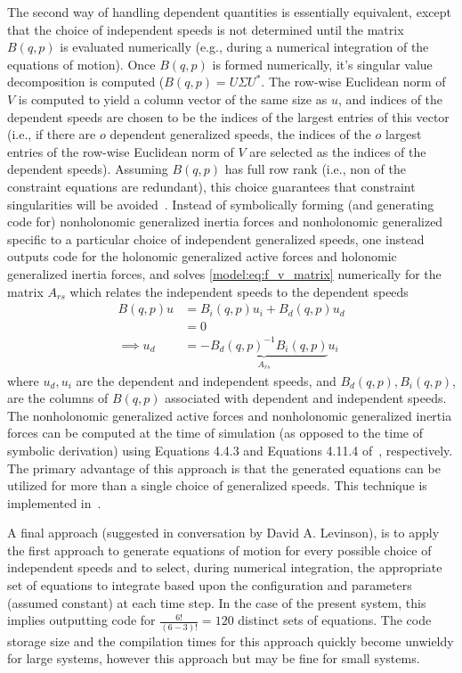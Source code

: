 The second way of handling dependent quantities is essentially equivalent,
except that the choice of independent speeds is not determined until the matrix
$B(q,p)$ is evaluated numerically (e.g., during a numerical integration of the
equations of motion). Once $B(q, p)$ is formed numerically, it's singular value
decomposition is computed ($B(q, p) = U\Sigma U^*$. The row-wise Euclidean norm
of $V$ is computed to yield a column vector of the same size as $u$, and
indices of the dependent speeds are chosen to be the indices of the largest
entries of this vector (i.e., if there are $o$ dependent generalized speeds,
the indices of the $o$ largest entries of the row-wise Euclidean norm of $V$
are selected as the indices of the dependent speeds). Assuming $B(q, p)$ has
full row rank (i.e., non of the constraint equations are redundant), this
choice guarantees that constraint singularities will be
avoided~\cite{Reckdahl1996}. Instead of symbolically forming (and generating
code for) nonholonomic generalized inertia forces and nonholonomic generalized
specific to a particular choice of independent generalized speeds, one instead
outputs code for the holonomic generalized active forces and holonomic
generalized inertia forces, and solves \autoref{model:eq:f_v_matrix}
numerically for the matrix $A_{rs}$ which relates the independent speeds to the
dependent speeds
\begin{align}
  B(q, p) u &= B_i(q, p) u_i + B_d(q, p) u_d \\
            &= 0 \\
\implies u_d &= \underbrace{-B_d(q, p)^{-1} B_i(q, p)}_{A_{rs}} u_i
\end{align}
where $u_d, u_i$ are the dependent and independent speeds, and $B_d(q,p),
B_i(q,p)$, are the columns of $B(q, p)$ associated with dependent and
independent speeds. The nonholonomic generalized active forces and nonholonomic
generalized inertia forces can be computed at the time of simulation (as
opposed to the time of symbolic derivation) using Equations 4.4.3 and Equations
4.11.4 of~\cite{Kane1985}, respectively. The primary advantage of this approach
is that the generated equations can be utilized for more than a single choice
of generalized speeds. This technique is implemented in~\cite{libbicycle}.

A final approach (suggested in conversation by David A. Levinson), is to apply
the first approach to generate equations of motion for every possible choice of
independent speeds and to select, during numerical integration, the appropriate
set of equations to integrate based upon the configuration and parameters
(assumed constant) at each time step. In the case of the present system, this
implies outputting code for $\frac{6!}{(6-3)!}=120$ distinct sets of equations.
The code storage size and the compilation times for this approach quickly
become unwieldy for large systems, however this approach but may be fine for
small systems.

